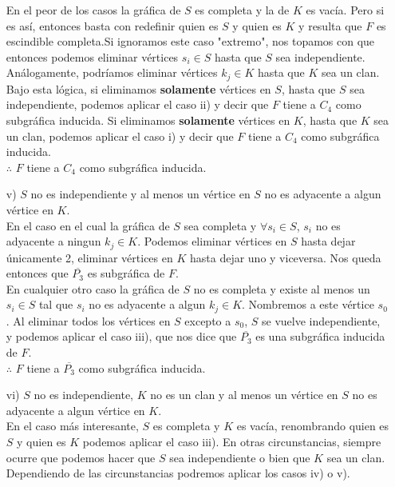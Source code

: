 \documentclass[12pt]{article}
\begin{document}
\begin{enumerate}
	En el peor de los casos la gráfica de $S$ es completa y la de $K$ es vacía. Pero si es así, entonces basta con redefinir quien es $S$ y quien es $K$ y resulta que $F$ es escindible completa.Si ignoramos este caso "extremo", nos topamos con que entonces podemos eliminar vértices $s_i \in S$ hasta que $S$ sea independiente. Análogamente, podríamos eliminar vértices $k_j \in K$ hasta que $K$ sea un clan.\\
	
	Bajo esta lógica, si eliminamos \textbf{solamente} vértices en $S$, hasta que $S$ sea independiente, podemos aplicar el caso ii) y decir que $F$ tiene a $C_4$ como subgráfica inducida. Si eliminamos \textbf{solamente} vértices en $K$, hasta que $K$ sea un clan, podemos aplicar el caso i) y decir que $F$ tiene a $C_4$ como subgráfica inducida.\\
	
	$\therefore$ $F$ tiene a $C_4$ como subgráfica inducida.\\
	
	\item[v)]$S$ no es independiente y al menos un vértice en $S$ no es adyacente a algun vértice en $K$.\\
	
	En el caso en el cual la gráfica de $S$ sea completa y $\forall s_i \in S$, $s_i$ no es adyacente a ningun $k_j \in K$. Podemos eliminar vértices en $S$ hasta dejar únicamente 2, eliminar vértices en $K$ hasta dejar uno y viceversa. Nos queda entonces que $\overline{P_3}$ es subgráfica de $F$.\\
	
	En cualquier otro caso la gráfica de $S$ no es completa y existe al menos un $s_i \in S$ tal que $s_i$ no es adyacente a algun $k_j \in K$. Nombremos a este vértice $s_0$. Al eliminar todos los vértices en $S$ excepto a $s_0$, $S$ se vuelve independiente, y podemos aplicar el caso iii), que nos dice que $\overline{P_3}$ es una subgráfica inducida de $F$.\\
	
	$\therefore$ $F$ tiene a  $\overline{P_3}$ como subgráfica inducida.\\
	
	\item[vi)]$S$ no es independiente, $K$ no es un clan y al menos un vértice en $S$ no es adyacente a algun vértice en $K$.\\
	
	En el caso más interesante, $S$ es completa y $K$ es vacía, renombrando quien es $S$ y quien es $K$ podemos aplicar el caso iii). En otras circunstancias, siempre ocurre que podemos hacer que $S$ sea independiente o bien que $K$ sea un clan. Dependiendo de las circunstancias podremos aplicar los casos iv) o v).\\
	
\end{enumerate}
\end{document}
